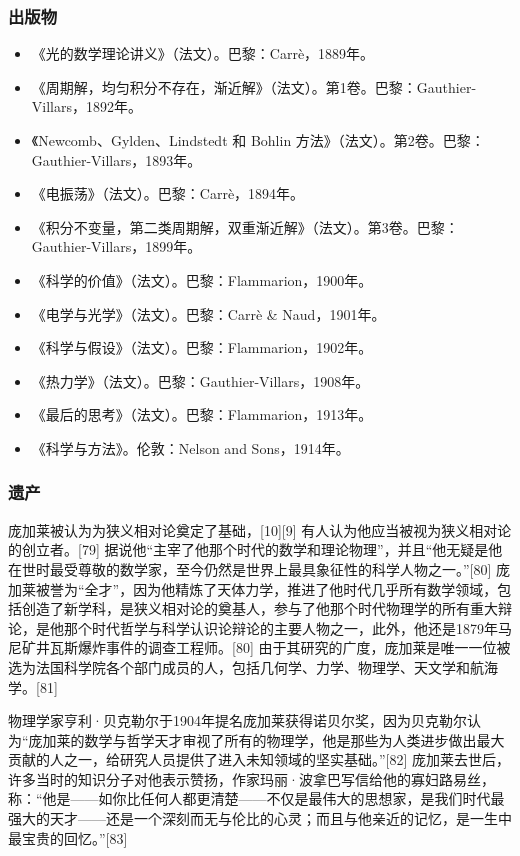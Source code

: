 \subsubsection{出版物}
\begin{itemize}
\item 《光的数学理论讲义》（法文）。巴黎：Carrè，1889年。  
\item 《周期解，均匀积分不存在，渐近解》（法文）。第1卷。巴黎：Gauthier-Villars，1892年。  
\item 《Newcomb、Gylden、Lindstedt 和 Bohlin 方法》（法文）。第2卷。巴黎：Gauthier-Villars，1893年。  
\item 《电振荡》（法文）。巴黎：Carrè，1894年。  
\item 《积分不变量，第二类周期解，双重渐近解》（法文）。第3卷。巴黎：Gauthier-Villars，1899年。  
\item 《科学的价值》（法文）。巴黎：Flammarion，1900年。  
\item 《电学与光学》（法文）。巴黎：Carrè & Naud，1901年。  
\item 《科学与假设》（法文）。巴黎：Flammarion，1902年。  
\item 《热力学》（法文）。巴黎：Gauthier-Villars，1908年。  
\item 《最后的思考》（法文）。巴黎：Flammarion，1913年。  
\item 《科学与方法》。伦敦：Nelson and Sons，1914年。
\end{itemize}
\subsubsection{遗产}  
庞加莱被认为为狭义相对论奠定了基础，[10][9] 有人认为他应当被视为狭义相对论的创立者。[79] 据说他“主宰了他那个时代的数学和理论物理”，并且“他无疑是他在世时最受尊敬的数学家，至今仍然是世界上最具象征性的科学人物之一。”[80] 庞加莱被誉为“全才”，因为他精炼了天体力学，推进了他时代几乎所有数学领域，包括创造了新学科，是狭义相对论的奠基人，参与了他那个时代物理学的所有重大辩论，是他那个时代哲学与科学认识论辩论的主要人物之一，此外，他还是1879年马尼矿井瓦斯爆炸事件的调查工程师。[80] 由于其研究的广度，庞加莱是唯一一位被选为法国科学院各个部门成员的人，包括几何学、力学、物理学、天文学和航海学。[81]

物理学家亨利·贝克勒尔于1904年提名庞加莱获得诺贝尔奖，因为贝克勒尔认为“庞加莱的数学与哲学天才审视了所有的物理学，他是那些为人类进步做出最大贡献的人之一，给研究人员提供了进入未知领域的坚实基础。”[82] 庞加莱去世后，许多当时的知识分子对他表示赞扬，作家玛丽·波拿巴写信给他的寡妇路易丝，称：“他是——如你比任何人都更清楚——不仅是最伟大的思想家，是我们时代最强大的天才——还是一个深刻而无与伦比的心灵；而且与他亲近的记忆，是一生中最宝贵的回忆。”[83]

